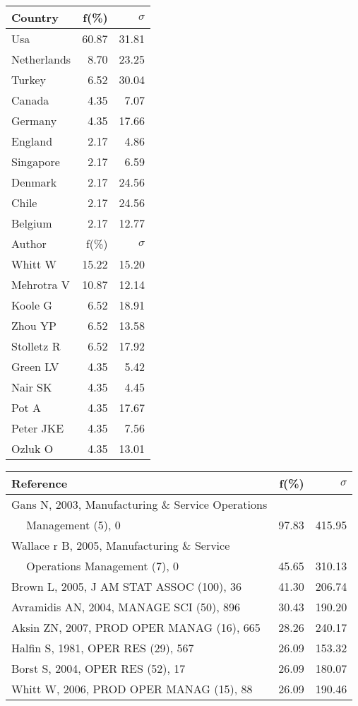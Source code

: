 \documentclass[a4paper,11pt]{report}
\begin{document}
\begin{landscape}
\begin{table}[!ht]
{\begin{tabular}{|l r r|}
\hline
Country & f(\%) & $\sigma$\\
\hline
Usa & 60.87 & 31.81\\
Netherlands & 8.70 & 23.25\\
Turkey & 6.52 & 30.04\\
Canada & 4.35 & 7.07\\
Germany & 4.35 & 17.66\\
England & 2.17 & 4.86\\
Singapore & 2.17 & 6.59\\
Denmark & 2.17 & 24.56\\
Chile & 2.17 & 24.56\\
Belgium & 2.17 & 12.77\\
\hline
\hline
Author & f(\%) & $\sigma$\\
\hline
Whitt W & 15.22 & 15.20\\
Mehrotra V & 10.87 & 12.14\\
Koole G & 6.52 & 18.91\\
Zhou YP & 6.52 & 13.58\\
Stolletz R & 6.52 & 17.92\\
Green LV & 4.35 & 5.42\\
Nair SK & 4.35 & 4.45\\
Pot A & 4.35 & 17.67\\
Peter JKE & 4.35 & 7.56\\
Ozluk O & 4.35 & 13.01\\
\hline
\end{tabular}
}
{\scriptsize\begin{tabular}{|l r r|}
\hline
Reference & f(\%) & $\sigma$\\
\hline
Gans N, 2003, Manufacturing \& Service Operations &  & \\
$\quad$ Management (5), 0 & 97.83 & 415.95\\
Wallace r B, 2005, Manufacturing \& Service &  & \\
$\quad$ Operations Management (7), 0 & 45.65 & 310.13\\
Brown L, 2005, J AM STAT ASSOC (100), 36 & 41.30 & 206.74\\
Avramidis AN, 2004, MANAGE SCI (50), 896 & 30.43 & 190.20\\
Aksin ZN, 2007, PROD OPER MANAG (16), 665 & 28.26 & 240.17\\
Halfin S, 1981, OPER RES (29), 567 & 26.09 & 153.32\\
Borst S, 2004, OPER RES (52), 17 & 26.09 & 180.07\\
Whitt W, 2006, PROD OPER MANAG (15), 88 & 26.09 & 190.46\\

\end{tabular}}
\end{table}
\end{landscape}
\end{document}
